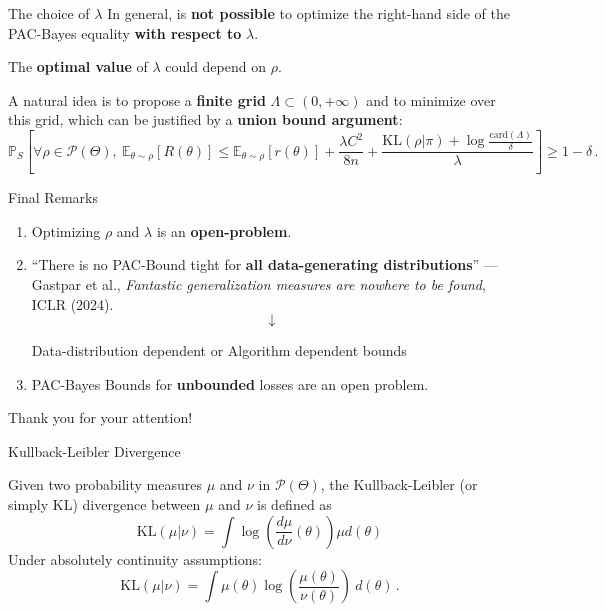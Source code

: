 \documentclass[aspectratio=159]{beamer}
\begin{document}
    \begin{frame}{The choice of \(\lambda\)}
        In general, is \textbf{not possible} to optimize the right-hand side of the PAC-Bayes equality \textbf{with respect to} \(\lambda\).
        
        \pause
        
        The \textbf{optimal value} of \(\lambda\) could depend on \(\rho\).
        
        \pause
        
        A natural idea is to propose a \textbf{finite grid} \(\Lambda \subset (0, +\infty)\) and to minimize over this grid, which can be justified by a \textbf{union bound argument}:
                \[
        \mathbb{P}_S \left[ \forall \rho \in \mathcal{P}(\Theta), \ \mathbb{E}_{\theta \sim \rho}[R(\theta)] \leq \mathbb{E}_{\theta \sim \rho}[r(\theta)] + \frac{\lambda C^2}{8n} + \frac{\text{KL}(\rho|\pi) + \log\tfrac{\text{card}(\Lambda)}{\delta}}{\lambda}\right] \geq 1-\delta\,.
        \]
    \end{frame}

    \begin{frame}{Final Remarks}
        \begin{enumerate}
            \item Optimizing \(\rho\) and \(\lambda\) is an \textbf{open-problem}.
            \item ``There is no PAC-Bound tight for \textbf{all data-generating distributions}'' --- Gastpar et al., \textit{Fantastic generalization measures are nowhere to be found}, ICLR (2024).\pause
            \[\downarrow\]
            \begin{center}
            Data-distribution dependent or Algorithm dependent bounds
            \end{center}
            \item PAC-Bayes Bounds for \textbf{unbounded} losses are an open problem.
        \end{enumerate}
    \end{frame}

    \begin{frame}[standout]
        Thank you for your {\color{magenta}attention}!
    \end{frame}

    \begin{frame}[allowframebreaks]
    \nocite{*}
    \printbibliography[heading=none]
    \end{frame}

    \begin{frame}{Kullback-Leibler Divergence}

    Given two probability measures \(\mu\) and \(\nu\) in \(\mathcal{P}(\Theta)\), the Kullback-Leibler (or simply KL) divergence between \(\mu\) and \(\nu\) is defined as
    \[
    \text{KL}(\mu| \nu) = \int \log \left(\frac{d\mu}{d\nu}(\theta) \right) \mu d(\theta)
    \]
    Under absolutely continuity assumptions:
    \[
    \text{KL}(\mu| \nu) = \int \mu (\theta) \log \left(\frac{\mu(\theta)}{\nu(\theta)} \right) \ d(\theta)\,.
    \]
    \end{frame}
\end{document}
